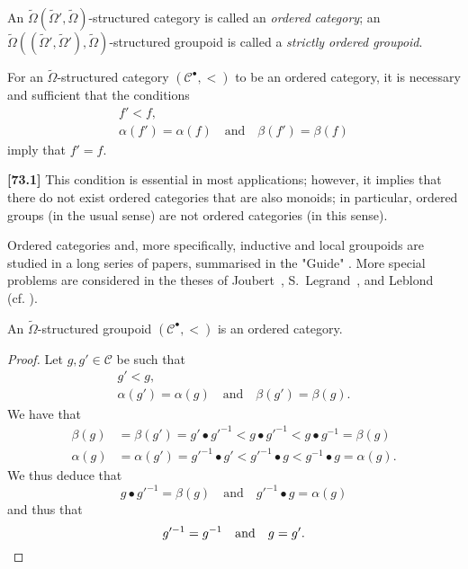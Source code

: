 \documentclass[a4paper,fleqn]{article}
\theoremstyle{plain}
\newenvironment{proposition}[1]
  {\renewcommand\theinnerproposition{#1}\innerproposition}
  {\endinnerproposition}
\theoremstyle{definition}
\newenvironment{definition}[1]
  {\renewcommand\theinnerdefinition{#1}\innerdefinition}
  {\endinnerdefinition}
\newenvironment{longcomm}[1]
  {\noindent\textbf{[#1]}\rmfamily}
  {}
\newcommand{\oldpage}[1]{{\marginpar{\footnotesize$\bigg\vert$\,\,\,\,\textit{p.~#1}}}}
\newcommand{\textand}{\quad\text{and}\quad}
\newcommand{\CC}{\mathcal{C}}
\begin{document}
\begin{definition}{18}
\label{definition:ii-18}
  An $\widetilde{\Omega}(\widetilde{\Omega}',\widetilde{\Omega})$-structured category is called an \emph{ordered category};
  an $\widetilde{\Omega}((\widetilde{\Omega}',\widetilde{\Omega}'),\widetilde{\Omega})$-structured groupoid is called a \emph{strictly ordered groupoid}.
\end{definition}

For an $\widetilde{\Omega}$-structured category $(\CC^\bullet,<)$ to be an ordered category, it is necessary and sufficient that the conditions
\[
  \begin{gathered}
    f'<f,
  \\\alpha(f')=\alpha(f)
    \textand
    \beta(f')=\beta(f)
  \end{gathered}
\]
imply that $f'=f$.

\begin{longcomm}{73.1}
  This condition is essential in most applications;
  however, it implies that there do not exist ordered categories that are also monoids;
  in particular, ordered groups (in the usual sense) are not ordered categories (in this sense).

  Ordered categories and, more specifically, inductive and local groupoids are studied in a long series of papers, summarised in the "Guide" \cite{coll86}.
  More special problems are considered in the theses of Joubert~\cite{comm57}, S.~Legrand~\cite{comm68}, and Leblond~\cite{comm66} (cf. \cite[Part~II]{coll}).
\end{longcomm}

\begin{proposition}{18}
\label{proposition:ii-18}
  \oldpage{402}
  An $\widetilde{\Omega}$-structured groupoid $(\CC^\bullet,<)$ is an ordered category.
\end{proposition}

\begin{proof}
  Let $g,g'\in\CC$ be such that
  \[
    \begin{gathered}
      g'<g,
    \\\alpha(g')=\alpha(g)
      \textand
      \beta(g')=\beta(g).
    \end{gathered}
  \]
  We have that
  \[
    \begin{aligned}
      \beta(g)
      &= \beta(g')
      = g'\bullet g'^{-1}
      < g\bullet g'^{-1}
      < g\bullet g^{-1}
      = \beta(g)
    \\\alpha(g)
      &= \alpha(g')
      = g'^{-1}\bullet g'
      < g'^{-1}\bullet g
      < g^{-1}\bullet g
      = \alpha(g).
    \end{aligned}
  \]
  We thus deduce that
  \[
    g\bullet g'^{-1} = \beta(g)
    \textand
    g'^{-1}\bullet g = \alpha(g)
  \]
  and thus that
  \[
    g'^{-1}=g^{-1}
    \textand
    g=g'.
    \qedhere
  \]
\end{proof}
\end{document}
